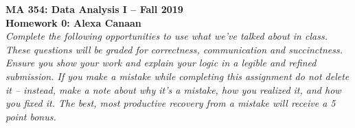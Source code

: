 \documentclass{article}
\begin{document}

\noindent \textbf{MA 354: Data Analysis I -- Fall 2019}\\%
\noindent \textbf{Homework 0: Alexa Canaan}\vspace{1em}\\
\emph{Complete the following opportunities to use what we've talked about in class. 
These questions will be graded for correctness, communication and succinctness. Ensure
you show your work and explain your logic in a legible and refined submission. If you
make a mistake while completing this assignment do not delete it -- instead, make a note
about why it's a mistake, how you realized it, and how you fixed it. The best, most 
productive recovery from a mistake will receive a 5 point bonus.}
\end{document}

